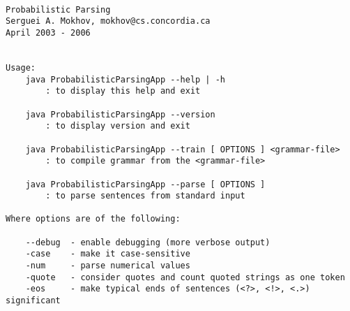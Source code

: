 \begin{verbatim}

Probabilistic Parsing
Serguei A. Mokhov, mokhov@cs.concordia.ca
April 2003 - 2006


Usage:
    java ProbabilisticParsingApp --help | -h
        : to display this help and exit

    java ProbabilisticParsingApp --version
        : to display version and exit

    java ProbabilisticParsingApp --train [ OPTIONS ] <grammar-file>
        : to compile grammar from the <grammar-file>

    java ProbabilisticParsingApp --parse [ OPTIONS ]
        : to parse sentences from standard input

Where options are of the following:

    --debug  - enable debugging (more verbose output)
    -case    - make it case-sensitive
    -num     - parse numerical values
    -quote   - consider quotes and count quoted strings as one token
    -eos     - make typical ends of sentences (<?>, <!>, <.>) significant


\end{verbatim}
